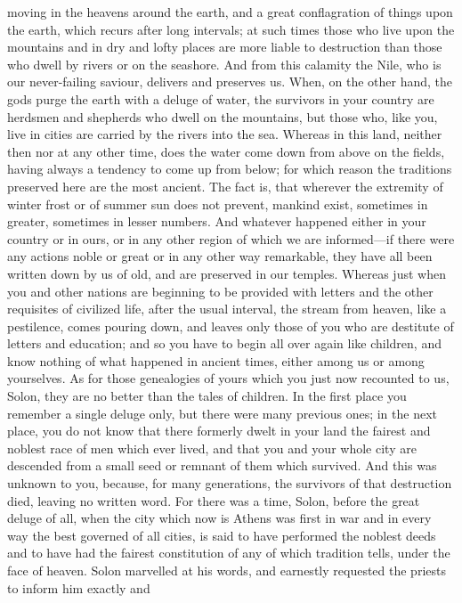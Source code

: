 moving in the heavens around the earth, and a great conflagration of
things upon the earth, which recurs after long intervals; at such times
those who live upon the mountains and in dry and lofty places are more
liable to destruction than those who dwell by rivers or on the seashore.
And from this calamity the Nile, who is our never-failing saviour,
delivers and preserves us. When, on the other hand, the gods purge the
earth with a deluge of water, the survivors in your country are herdsmen
and shepherds who dwell on the mountains, but those who, like you, live in
cities are carried by the rivers into the sea. Whereas in this land,
neither then nor at any other time, does the water come down from above on
the fields, having always a tendency to come up from below; for which
reason the traditions preserved here are the most ancient. The fact is,
that wherever the extremity of winter frost or of summer sun does not
prevent, mankind exist, sometimes in greater, sometimes in lesser numbers.
And whatever happened either in your country or in ours, or in any other
region of which we are informed—if there were any actions noble or
great or in any other way remarkable, they have all been written down by
us of old, and are preserved in our temples. Whereas just when you and
other nations are beginning to be provided with letters and the other
requisites of civilized life, after the usual interval, the stream from
heaven, like a pestilence, comes pouring down, and leaves only those of
you who are destitute of letters and education; and so you have to begin
all over again like children, and know nothing of what happened in ancient
times, either among us or among yourselves. As for those genealogies of
yours which you just now recounted to us, Solon, they are no better than
the tales of children. In the first place you remember a single deluge
only, but there were many previous ones; in the next place, you do not
know that there formerly dwelt in your land the fairest and noblest race
of men which ever lived, and that you and your whole city are descended
from a small seed or remnant of them which survived. And this was unknown
to you, because, for many generations, the survivors of that destruction
died, leaving no written word. For there was a time, Solon, before the
great deluge of all, when the city which now is Athens was first in war
and in every way the best governed of all cities, is said to have
performed the noblest deeds and to have had the fairest constitution of
any of which tradition tells, under the face of heaven. Solon marvelled at
his words, and earnestly requested the priests to inform him exactly and
